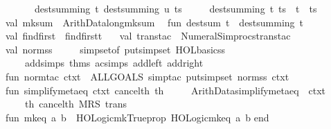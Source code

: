 \begin{isabellebody}
\ \ \ \ \ \ \ \ dest{\isacharunderscore}summing\ {\isacharparenleft}t{\isacharcomma}\ dest{\isacharunderscore}summing\ {\isacharparenleft}u{\isacharcomma}\ ts{\isacharparenright}{\isacharparenright}\isanewline
\ \ \ \ {\isacharbar}\ dest{\isacharunderscore}summing\ {\isacharparenleft}t{\isacharcomma}\ ts{\isacharparenright}\ {\isacharequal}\ t\ {\isacharcolon}{\isacharcolon}\ ts\isanewline
\isanewline
\ \ val\ mk{\isacharunderscore}sum\ {\isacharequal}\ Arith{\isacharunderscore}Data{\isachardot}long{\isacharunderscore}mk{\isacharunderscore}sum\isanewline
\ \ fun\ dest{\isacharunderscore}sum\ t\ {\isacharequal}\ dest{\isacharunderscore}summing\ {\isacharparenleft}t{\isacharcomma}\ {\isacharbrackleft}{\isacharbrackright}{\isacharparenright}\isanewline
\ \ val\ find{\isacharunderscore}first\ {\isacharequal}\ find{\isacharunderscore}first{\isacharunderscore}t\ {\isacharbrackleft}{\isacharbrackright}\isanewline
\ \ val\ trans{\isacharunderscore}tac\ {\isacharequal}\ Numeral{\isacharunderscore}Simprocs{\isachardot}trans{\isacharunderscore}tac\isanewline
\ \ val\ norm{\isacharunderscore}ss\ {\isacharequal}\isanewline
\ \ \ \ simpset{\isacharunderscore}of\ {\isacharparenleft}put{\isacharunderscore}simpset\ HOL{\isacharunderscore}basic{\isacharunderscore}ss\ \isactrlcontext \isanewline
\ \ \ \ \ \ addsimps\ {\isacharat}{\isacharbraceleft}thms\ ac{\isacharunderscore}simps\ add{\isacharunderscore}{}{\isacharunderscore}left\ add{\isacharunderscore}{}{\isacharunderscore}right{\isacharbraceright}{\isacharparenright}\isanewline
\ \ fun\ norm{\isacharunderscore}tac\ ctxt\ {\isacharequal}\ ALLGOALS\ {\isacharparenleft}simp{\isacharunderscore}tac\ {\isacharparenleft}put{\isacharunderscore}simpset\ norm{\isacharunderscore}ss\ ctxt{\isacharparenright}{\isacharparenright}\isanewline
\ \ fun\ simplify{\isacharunderscore}meta{\isacharunderscore}eq\ ctxt\ cancel{\isacharunderscore}th\ th\ {\isacharequal}\isanewline
\ \ \ \ Arith{\isacharunderscore}Data{\isachardot}simplify{\isacharunderscore}meta{\isacharunderscore}eq\ {\isacharbrackleft}{\isacharbrackright}\ ctxt\isanewline
\ \ \ \ \ \ {\isacharparenleft}{\isacharbrackleft}th{\isacharcomma}\ cancel{\isacharunderscore}th{\isacharbrackright}\ MRS\ trans{\isacharparenright}\isanewline
\ \ fun\ mk{\isacharunderscore}eq\ {\isacharparenleft}a{\isacharcomma}\ b{\isacharparenright}\ {\isacharequal}\ HOLogic{\isachardot}mk{\isacharunderscore}Trueprop\ {\isacharparenleft}HOLogic{\isachardot}mk{\isacharunderscore}eq\ {\isacharparenleft}a{\isacharcomma}\ b{\isacharparenright}{\isacharparenright}\isanewline
end\isanewline

\end{isabellebody}
